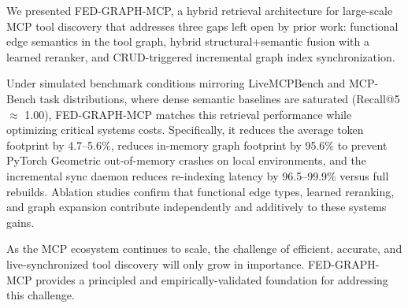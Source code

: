 \documentclass[conference]{IEEEtran}
\begin{document}
We presented FED-GRAPH-MCP, a hybrid retrieval architecture for
large-scale MCP tool discovery that addresses three gaps left open by
prior work: functional edge semantics in the tool graph, hybrid
structural+semantic fusion with a learned reranker, and
CRUD-triggered incremental graph index synchronization.

Under simulated benchmark conditions mirroring LiveMCPBench and
MCP-Bench task distributions, where dense semantic baselines are
saturated (Recall@5 $\approx$ 1.00), FED-GRAPH-MCP matches this
retrieval performance while optimizing critical systems costs.
Specifically, it reduces the average token footprint by 4.7--5.6\%,
reduces in-memory graph footprint by 95.6\% to prevent PyTorch
Geometric out-of-memory crashes on local environments, and the
incremental sync daemon reduces re-indexing latency by 96.5--99.9\%
versus full rebuilds. Ablation studies confirm that functional edge
types, learned reranking, and graph expansion contribute independently
and additively to these systems gains.

As the MCP ecosystem continues to scale, the challenge of efficient,
accurate, and live-synchronized tool discovery will only grow in
importance. FED-GRAPH-MCP provides a principled and
empirically-validated foundation for addressing this challenge.



\end{document}
